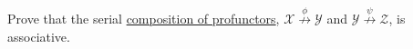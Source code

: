 Prove that the serial \href{doc/1 math/Seven Sketches in Compositionality/Chapter 4: Co-design/3 Categories of profunctors/1 Composing profunctors/1 V-profunctor composition}{composition of profunctors}, $\mathcal{X}\overset{\phi}\nrightarrow\mathcal{Y}$ and $\mathcal{Y}\overset{\psi}\nrightarrow\mathcal{Z}$, is associative.
